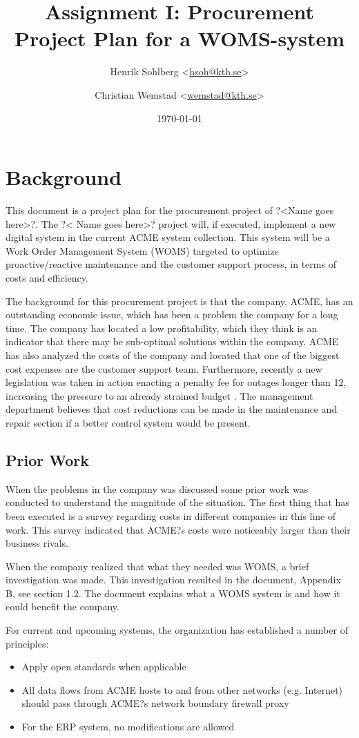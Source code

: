\documentclass[a4paper]{article}
\title{Assignment I: Procurement Project Plan for a WOMS-system}
\author{Henrik Sohlberg <\href{mailto:hsoh@kth.se}{hsoh@kth.se}> %
\and Christian Wemstad <\href{mailto:wemstad@kth.se}{wemstad@kth.se}> %
}
\date{\today}
\begin{document}
\maketitle

\newpage
          
\tableofcontents
\newpage
\section{Background}
\label{sec:background}
This document is a project plan for the procurement project of ?<Name goes here>?. The ?< Name goes here>? project will, if executed, implement a new digital system in the current ACME system collection. This system will be a Work Order Management System (WOMS) targeted to optimize proactive/reactive maintenance and the customer support process, in terms of costs and efficiency.

The background for this procurement project is that the company, ACME, has an outstanding economic issue, which has been a problem the company for a long time. The company has located a low profitability, which they think is an indicator that there may be sub-optimal solutions within the company. ACME has also analyzed the costs of the company and located that one of the biggest cost expenses are the customer support team. Furthermore, recently a new legislation was taken in action enacting a penalty fee for outages longer than 12, increasing the pressure to an already strained budget . The management department believes that cost reductions can be made in the maintenance and repair section if a better control system would be present. 

\subsection{Prior Work}
\label{sub:prior_work}
When the problems in the company was discussed some prior work was conducted to understand the magnitude of the situation. The first thing that has been executed is a survey regarding costs in different companies in this line of work. This survey indicated that ACME?s costs were noticeably larger than their business rivals.

When the company realized that what they needed was WOMS, a brief investigation was made. This investigation resulted in the document, Appendix B, see section 1.2. The document explains what a WOMS system is and how it could benefit the company.

For current and upcoming systems, the organization has established a number of principles:
\begin{itemize}
\item Apply open standards when applicable
\item All data flows from ACME hosts to and from other networks (e.g. Internet) should pass through ACME?s network boundary firewall proxy
\item For the ERP system, no modifications are allowed
\end{itemize}
\end{document}
